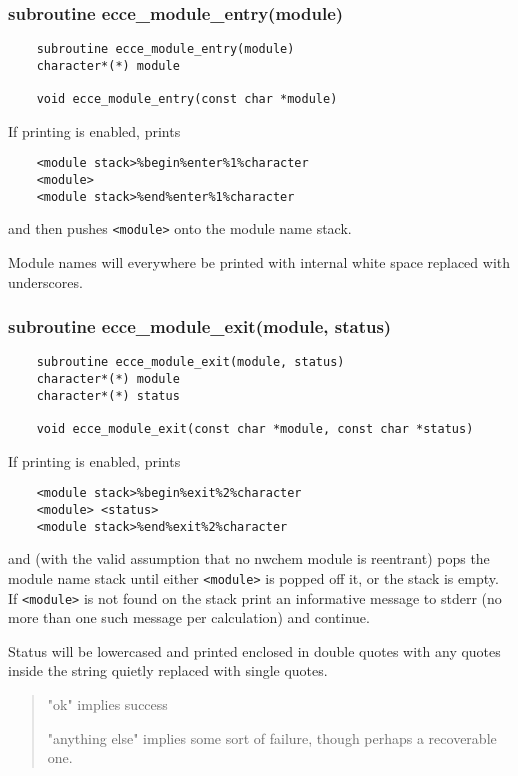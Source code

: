 \subsubsection{  subroutine ecce\_module\_entry(module)}

\begin{verbatim}
    subroutine ecce_module_entry(module)
    character*(*) module

    void ecce_module_entry(const char *module)
\end{verbatim} 
If printing is enabled, prints

\begin{verbatim}
    <module stack>%begin%enter%1%character
    <module>
    <module stack>%end%enter%1%character
\end{verbatim}
    and then pushes \verb+<module>+ onto the module name stack.  

    Module names will everywhere be printed with internal white space 
    replaced with underscores.

\subsubsection{subroutine ecce\_module\_exit(module, status)}

\begin{verbatim}
    subroutine ecce_module_exit(module, status)
    character*(*) module
    character*(*) status

    void ecce_module_exit(const char *module, const char *status)
\end{verbatim}

    If printing is enabled, prints

\begin{verbatim}
    <module stack>%begin%exit%2%character
    <module> <status>
    <module stack>%end%exit%2%character
\end{verbatim}
    and (with the valid assumption that no nwchem module is reentrant) 
    pops the module name stack until either \verb+<module>+ is popped
    off it, or the stack is empty.  If \verb+<module>+ is not found on
    the stack print an informative message to stderr (no more than
    one such message per calculation) and continue.

    Status will be lowercased and printed enclosed in double quotes with 
    any quotes inside the string quietly replaced with single quotes.
\begin{quotation}

  "ok" implies success

  "anything else" implies some sort of failure, though perhaps a
  recoverable one.

\end{quotation}

